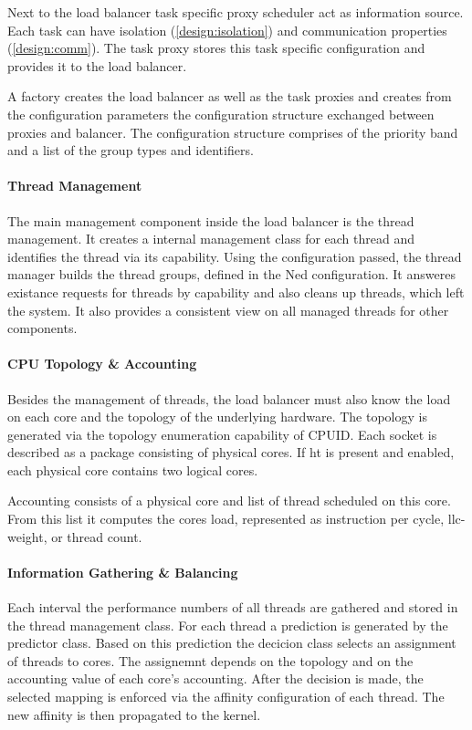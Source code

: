 Next to the load balancer task specific proxy scheduler act as information
source.
Each task can have isolation (\ref{design:isolation}) and communication
properties (\ref{design:comm}).
The task proxy stores this task specific configuration and provides it to the
load balancer.

A factory creates the load balancer as well as the task proxies and creates
from the configuration parameters the configuration structure exchanged between
proxies and balancer.
The configuration structure comprises of the priority band and a list of
the group types and identifiers.


\paragraph{Thread Management}
The main management component inside the load balancer is the thread
management.
It creates a internal management class for each thread and identifies the
thread via its capability.
Using the configuration passed, the thread manager builds the thread groups,
defined in the Ned configuration.
It answeres existance requests for threads by capability and also cleans up
threads, which left the system.
It also provides a consistent view on all managed threads for other components.


\paragraph{CPU Topology \& Accounting}
Besides the management of threads, the load balancer must also know the load on
each core and the topology of the underlying hardware.
The topology is generated via the topology enumeration capability of CPUID.
Each socket is described as a package consisting of physical cores.
If \gls{ht} is present and enabled, each physical core contains two logical
cores.

Accounting consists of a physical core and list of thread scheduled on this
core.
From this list it computes the cores load, represented as instruction
per cycle, \gls{llc}-weight, or thread count.


\paragraph{Information Gathering \& Balancing}
Each interval the performance numbers of all threads are gathered and stored in
the thread management class.
For each thread a prediction is generated by the predictor class.
Based on this prediction the decicion class selects an assignment of threads to
cores.
The assignemnt depends on the topology and on the accounting value of each
core's accounting.
After the decision is made, the selected mapping is enforced via the affinity
configuration of each thread.
The new affinity is then propagated to the kernel.



